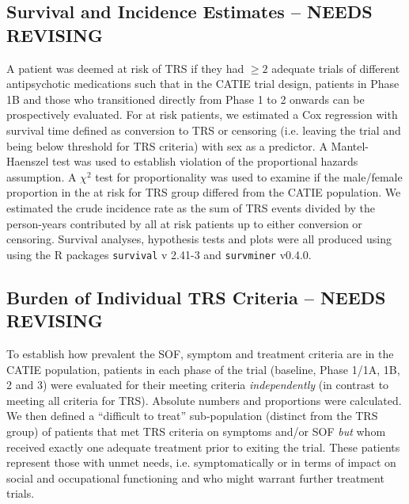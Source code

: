 \documentclass[a4paper,nobib]{article}
\begin{document}
\subsection*{Survival and Incidence Estimates -- NEEDS REVISING}
A patient was deemed at risk of TRS if they had $\geqslant 2$ adequate trials of different antipsychotic medications such that in the CATIE trial design, patients in Phase 1B and those who transitioned directly from Phase 1 to 2 onwards can be prospectively evaluated.  For at risk patients, we estimated a Cox regression with survival time defined as conversion to TRS or censoring (i.e. leaving the trial and being below threshold for TRS criteria) with sex as a predictor.  A Mantel-Haenszel test was used to establish violation of the proportional hazards assumption.  A $\chi^2$ test for proportionality was used to examine if the male/female proportion in the at risk for TRS group differed from the CATIE population.  We estimated the crude incidence rate as the sum of TRS events divided by the person-years contributed by all at risk patients up to either conversion or censoring. Survival analyses, hypothesis tests and plots were all produced using using the \textsf{R} packages \texttt{survival} v 2.41-3 and \texttt{survminer} v0.4.0.

\subsection*{Burden of Individual TRS Criteria -- NEEDS REVISING}
To establish how prevalent the SOF, symptom and treatment criteria are in the CATIE population, patients in each phase of the trial (baseline, Phase 1/1A, 1B, 2 and 3) were evaluated for their meeting criteria \emph{independently} (in contrast to meeting all criteria for TRS).  Absolute numbers and proportions were calculated.  We then defined a ``difficult to treat'' sub-population (distinct from the TRS group) of patients that met TRS criteria on symptoms and/or SOF \emph{but} whom received exactly one adequate treatment prior to exiting the trial.  These patients represent those with unmet needs, i.e. symptomatically or in terms of impact on social and occupational functioning and who might warrant further treatment trials. 
\end{document}
